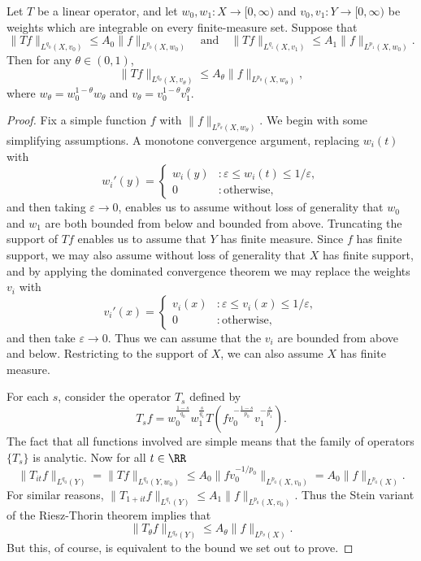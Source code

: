 \begin{theorem}
  Let $T$ be a linear operator, and let $w_0, w_1: X \to [0,\infty)$ and $v_0, v_1 : Y \to [0,\infty)$ be weights which are integrable on every finite-measure set. Suppose that
  \[ \| Tf \|_{L^{q_0}(X,v_0)} \leq A_0 \| f \|_{L^{p_0}(X,w_0)}\quad\text{and}\quad \| Tf \|_{L^{q_1}(X,v_1)} \leq A_1 \| f \|_{L^{p_1}(X,w_0)}. \]
  Then for any $\theta \in (0,1)$,
  \[ \| Tf \|_{L^{q_\theta}(X,v_\theta)} \leq A_\theta \| f \|_{L^{p_\theta}(X,w_\theta)}, \]
  where $w_\theta = w_0^{1-\theta} w_\theta$ and $v_\theta = v_0^{1-\theta} v_1^\theta$.
\end{theorem}
\begin{proof}
  Fix a simple function $f$ with $\| f \|_{L^{p_\theta}(X,w_\theta)}$. We begin with some simplifying assumptions. A monotone convergence argument, replacing $w_i(t)$ with
  \[ w_i'(y) = \begin{cases} w_i(y) &: \varepsilon \leq w_i(t) \leq 1/\varepsilon, \\ 0 &: \text{otherwise}, \end{cases} \]
  and then taking $\varepsilon \to 0$, enables us to assume without loss of generality that $w_0$ and $w_1$ are both bounded from below and bounded from above. Truncating the support of $Tf$ enables us to assume that $Y$ has finite measure. Since $f$ has finite support, we may also assume without loss of generality that $X$ has finite support, and by applying the dominated convergence theorem we may replace the weights $v_i$ with
  \[ v_i'(x) = \begin{cases} v_i(x) &: \varepsilon \leq v_i(x) \leq 1/\varepsilon, \\ 0 &: \text{otherwise}, \end{cases} \]
  and then take $\varepsilon \to 0$. Thus we can assume that the $v_i$ are bounded from above and below. Restricting to the support of $X$, we can also assume $X$ has finite measure.

  For each $s$, consider the operator $T_s$ defined by
  \[ T_s f = w_0^{\frac{1-s}{q_0}} w_1^{\frac{s}{q_1}} T \left( f v_0^{- \frac{1-s}{p_0}} v_1^{-\frac{s}{p_1}} \right). \]
  The fact that all functions involved are simple means that the family of operators $\{ T_s \}$ is analytic. Now for all $t \in \RR$
  \[ \| T_{it} f \|_{L^{q_0}(Y)} = \| T f \|_{L^{q_0}(Y,w_0)} \leq A_0 \| f v_0^{-1/p_0} \|_{L^{p_0}(X,v_0)} = A_0 \| f \|_{L^{p_0}(X)}. \]
  For similar reasons, $\| T_{1 + it} f \|_{L^{q_1}(Y)} \leq A_1 \| f \|_{L^{p_0}(X,v_0)}$. Thus the Stein variant of the Riesz-Thorin theorem implies that
  \[ \| T_\theta f \|_{L^{q_\theta}(Y)} \leq A_\theta \| f \|_{L^{p_\theta}(X)}. \]
  But this, of course, is equivalent to the bound we set out to prove.
\end{proof}

